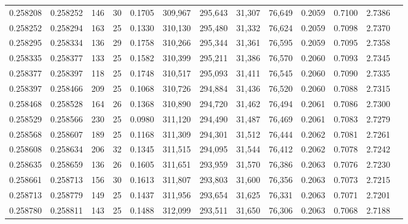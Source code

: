 \begin{tabular}{rrrrrrrrrrrrr}
0.258208 & 0.258252 &   146 &  30 &                                     0.1705 & 309,967 & 295,643 &  31,307 &  76,649 & 0.2059 & 0.7100 & 2.7386 \\
0.258252 & 0.258294 &   163 &  25 &                                     0.1330 & 310,130 & 295,480 &  31,332 &  76,624 & 0.2059 & 0.7098 & 2.7370 \\
0.258295 & 0.258334 &   136 &  29 &                                     0.1758 & 310,266 & 295,344 &  31,361 &  76,595 & 0.2059 & 0.7095 & 2.7358 \\
0.258335 & 0.258377 &   133 &  25 &                                     0.1582 & 310,399 & 295,211 &  31,386 &  76,570 & 0.2060 & 0.7093 & 2.7345 \\
0.258377 & 0.258397 &   118 &  25 &                                     0.1748 & 310,517 & 295,093 &  31,411 &  76,545 & 0.2060 & 0.7090 & 2.7335 \\
0.258397 & 0.258466 &   209 &  25 &                                     0.1068 & 310,726 & 294,884 &  31,436 &  76,520 & 0.2060 & 0.7088 & 2.7315 \\
0.258468 & 0.258528 &   164 &  26 &                                     0.1368 & 310,890 & 294,720 &  31,462 &  76,494 & 0.2061 & 0.7086 & 2.7300 \\
0.258529 & 0.258566 &   230 &  25 &                                     0.0980 & 311,120 & 294,490 &  31,487 &  76,469 & 0.2061 & 0.7083 & 2.7279 \\
0.258568 & 0.258607 &   189 &  25 &                                     0.1168 & 311,309 & 294,301 &  31,512 &  76,444 & 0.2062 & 0.7081 & 2.7261 \\
0.258608 & 0.258634 &   206 &  32 &                                     0.1345 & 311,515 & 294,095 &  31,544 &  76,412 & 0.2062 & 0.7078 & 2.7242 \\
0.258635 & 0.258659 &   136 &  26 &                                     0.1605 & 311,651 & 293,959 &  31,570 &  76,386 & 0.2063 & 0.7076 & 2.7230 \\
0.258661 & 0.258713 &   156 &  30 &                                     0.1613 & 311,807 & 293,803 &  31,600 &  76,356 & 0.2063 & 0.7073 & 2.7215 \\
0.258713 & 0.258779 &   149 &  25 &                                     0.1437 & 311,956 & 293,654 &  31,625 &  76,331 & 0.2063 & 0.7071 & 2.7201 \\
0.258780 & 0.258811 &   143 &  25 &                                     0.1488 & 312,099 & 293,511 &  31,650 &  76,306 & 0.2063 & 0.7068 & 2.7188 \\

\end{tabular}
